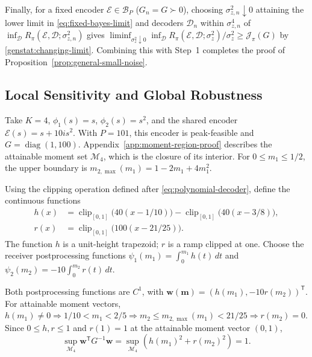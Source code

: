 \documentclass[journal,12pt,onecolumn,draftclsnofoot]{IEEEtran}
\newcommand{\enc}{\mathscr{E}}\newcommand{\dec}{\mathscr{D}}\newcommand{\R}{\mathbb R}\newcommand{\C}{\mathbb C}
\newcommand{\T}{\mathsf T}\newcommand{\suc}{\succeq}
\begin{document}
Finally, for a fixed encoder $\enc\in\mathcal B_P$ ($G_n=G\succ0$), choosing $\sigma_{z,n}^2\downarrow0$ attaining the lower limit in \eqref{eq:fixed-bayes-limit} and decoders $\dec_n$ within $\sigma_{z,n}^4$ of $\inf_\dec R_\pi(\enc,\dec;\sigma_{z,n}^2)$ gives $\liminf_{\sigma_z^2\downarrow0}\inf_\dec R_\pi(\enc,\dec;\sigma_z^2)/\sigma_z^2\ge\mathcal J_\pi(G)$ by \eqref{genstat:changing-limit}. Combining this with Step~1 completes the proof of Proposition~\ref{prop:general-small-noise}.



\subsection{Local Sensitivity and Global Robustness}\label{genstat:counterexamples}

Take $K=4$, $\phi_1(s)=s$, $\phi_2(s)=s^2$, and the shared encoder $\enc(s)=s+10is^2$. With $P=101$, this encoder is peak-feasible and $G=\operatorname{diag}(1,100)$.
Appendix~\ref{app:moment-region-proof} describes the attainable moment set $\mathcal M_4$, which is the closure of its interior. For $0\le m_1\le1/2$, the upper boundary is $m_{2,\max}(m_1)=1-2m_1+4m_1^2$.

Using the clipping operation defined after \eqref{eq:polynomial-decoder}, define the continuous functions
\begin{align}
h(x)&=\operatorname{clip}_{[0,1]}\bigl(40(x-1/10)\bigr)
      -\operatorname{clip}_{[0,1]}\bigl(40(x-3/8)\bigr),\\
r(x)&=\operatorname{clip}_{[0,1]}\bigl(100(x-21/25)\bigr).
\end{align}
The function $h$ is a unit-height trapezoid; $r$ is a ramp clipped at one.
Choose the receiver postprocessing functions $\psi_1(m_1)=\int_0^{m_1}h(t)\,dt$ and $\psi_2(m_2)=-10\int_0^{m_2}r(t)\,dt$.

Both postprocessing functions are $C^1$, with
$\boldsymbol w(\boldsymbol m)=(h(m_1),-10r(m_2))^\T$.
For attainable moment vectors,
$h(m_1)\ne0\Rightarrow 1/10<m_1<2/5
\Rightarrow m_2\le m_{2,\max}(m_1)<21/25
\Rightarrow r(m_2)=0$.
Since $0\le h,r\le1$ and $r(1)=1$ at the attainable moment vector $(0,1)$,
$$\sup_{\mathcal M_4}\boldsymbol w^\T G^{-1}\boldsymbol w
 =\sup_{\mathcal M_4}(h(m_1)^2+r(m_2)^2)=1.$$
\end{document}
